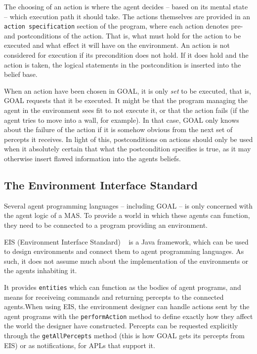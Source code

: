 The choosing of an action is where the agent decides -- based on its
mental state -- which execution path it should take. The actions themselves
are provided in an \texttt{action specification} section of the program,
where each action denotes pre- and postconditions of the action. That
is, what must hold for the action to be executed and what effect it
will have on the environment. An action is not considered for execution
if its precondition does not hold. If it does hold and the action
is taken, the logical statements in the postcondition is inserted
into the belief base. 

When an action have been chosen in GOAL, it is only \emph{set} to
be executed, that is, GOAL requests that it be executed. It might
be that the program managing the agent in the environment sees fit
to not execute it, or that the action fails (if the agent tries to
move into a wall, for example). In that case, GOAL only knows about
the failure of the action if it is somehow obvious from the next set
of percepts it receives. In light of this, postconditions on actions
should only be used when it absolutely certain that what the postcondition
specifies is true, as it may otherwise insert flawed information into
the agents beliefs.


\subsection{The Environment Interface Standard}

Several agent programming languages -- including GOAL -- is only concerned
with the agent logic of a MAS. To provide a world in which these agents
can function, they need to be connected to a program providing an
environment. 

EIS (Environment Interface Standard) ~\cite{EIS09} is a Java framework,
which can be used to design environments and connect them to agent
programming languages. As such, it does not assume much about the
implementation of the environments or the agents inhabiting it. 

It provides \texttt{entities} which can function as the bodies of
agent programs, and means for receiveing commands and returning percepts
to the connected agents.When using EIS, the environment designer can
handle actions sent by the agent programs with the \texttt{performAction}
method to define exactly how they affect the world the designer have
constructed. Percepts can be requested explicitly through the \texttt{getAllPercepts}
method (this is how GOAL gets its percepts from EIS) or as notifications,
for APLs that support it. 

